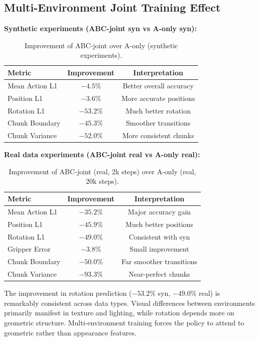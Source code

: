 \documentclass[10pt,twocolumn]{article}
\begin{document}
\subsection{Multi-Environment Joint Training Effect}

\textbf{Synthetic experiments (ABC-joint syn vs A-only syn):}

\begin{table}[H]
\centering
\caption{Improvement of ABC-joint over A-only (synthetic experiments).}
\label{tab:improvement}
\begin{tabular}{lcc}
\toprule
\textbf{Metric} & \textbf{Improvement} & \textbf{Interpretation} \\
\midrule
Mean Action L1 & $-4.5\%$ & Better overall accuracy \\
Position L1 & $-3.6\%$ & More accurate positions \\
Rotation L1 & \textbf{$-53.2\%$} & Much better rotation \\
Chunk Boundary & \textbf{$-45.3\%$} & Smoother transitions \\
Chunk Variance & \textbf{$-52.0\%$} & More consistent chunks \\
\bottomrule
\end{tabular}
\end{table}

\textbf{Real data experiments (ABC-joint real vs A-only real):}

\begin{table}[H]
\centering
\caption{Improvement of ABC-joint (real, 2k steps) over A-only (real, 20k steps).}
\label{tab:improvement_real}
\begin{tabular}{lcc}
\toprule
\textbf{Metric} & \textbf{Improvement} & \textbf{Interpretation} \\
\midrule
Mean Action L1 & \textbf{$-35.2\%$} & Major accuracy gain \\
Position L1 & \textbf{$-45.9\%$} & Much better positions \\
Rotation L1 & \textbf{$-49.0\%$} & Consistent with syn \\
Gripper Error & $-3.8\%$ & Small improvement \\
Chunk Boundary & \textbf{$-50.0\%$} & Far smoother transitions \\
Chunk Variance & \textbf{$-93.3\%$} & Near-perfect chunks \\
\bottomrule
\end{tabular}
\end{table}

The improvement in rotation prediction ($-53.2\%$ syn, $-49.0\%$ real) is remarkably consistent across data types. Visual differences between environments primarily manifest in texture and lighting, while rotation depends more on geometric structure. Multi-environment training forces the policy to attend to geometric rather than appearance features.
\end{document}

